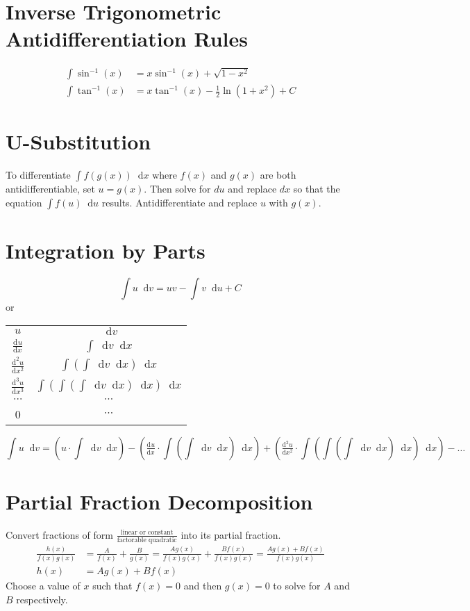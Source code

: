 \documentclass[12pt]{article}
\newcommand*{\rmaskip}{\setlength{\abovedisplayskip}{0pt}}
\newcommand*{\rmbskip}{\setlength{\belowdisplayskip}{0pt}}
\newcommand*{\rmskip}{\rmaskip \rmbskip}
\newcommand*{\dd}[3][]{\tfrac{\mathrm{d}^{#1}#2}{\mathrm{d}#3^{#1}}}
\newcommand*{\D}[1]{\mathop{}\!\mathrm{d} #1}
\begin{document}
\section*{Inverse Trigonometric Antidifferentiation Rules}
{\rmskip\begin{align*}
  \int \sin^{-1}(x) &= x\sin^{-1}(x) + \sqrt{1-x^2}\\
  \int \tan^{-1}(x) &= x\tan^{-1}(x) - \frac{1}{2} \ln(1 + x^2) + C
\end{align*}}%
\section*{U-Substitution}
To differentiate \(\int f(g(x)) \D{x}\) where \(f(x)\) and \(g(x)\) are both
antidifferentiable, set \(u = g(x)\). Then solve for \(du\) and replace \(dx\)
so that the equation \(\int f(u) \D{u}\) results. Antidifferentiate and
replace \(u\) with \(g(x)\).
\section*{Integration by Parts}
\[
  \int u \D{v} = uv - \int v \D{u} + C
\]
or\\
{\renewcommand{\arraystretch}{1.5}\begin{tabular}{c c}
  \(u\) & \(\D{v}\)\\
  \(\dd{u}{x}\) & \(\int \D{v} \D{x}\)\\
  \(\dd[2]{u}{x}\) & \(\int\left(\int\D{v}\D{x}\right)\D{x}\)\\
  \(\dd[3]{u}{x}\) & \(\int\left(\int\left(\int\D{v}\D{x}\right)\D{x}
    \right)\D{x}\)\\
  \(\cdots\) & \(\cdots\)\\
  0 & \(\cdots\)
\end{tabular}}
\[
  \int u \D{v} = \left(u \cdot \int \D{v} \D{x}\right) - \left(
    \dd{u}{x} \cdot \int \left( \int \D{v} \D{x} \right) \D{x}
    \right) + \left(\dd[2]{u}{x} \cdot \int \left( \int \left( \int \D{v}
    \D{x} \right) \D{x} \right) \D{x} \right) - \dots
\]
\section*{Partial Fraction Decomposition}
Convert fractions of form \(\frac{\text{linear or constant}}{\text{factorable
quadratic}}\) into its partial fraction.
{\rmskip\begin{align*}
  \frac{h(x)}{f(x)g(x)} &= \frac{A}{f(x)} + \frac{B}{g(x)} = \frac{Ag(x)}
  {f(x)g(x)} + \frac{Bf(x)}{f(x)g(x)} = \frac{Ag(x) + Bf(x)}{f(x)g(x)}\\
  h(x) &= Ag(x) + Bf(x)
\end{align*}}%
Choose a value of \(x\) such that \(f(x) = 0\) and then \(g(x) = 0\) to solve
for \(A\) and \(B\) respectively.
\end{document}
